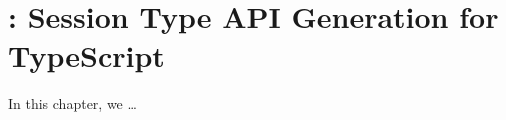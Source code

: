 \chapter{: Session Type API Generation for TypeScript}
\label{chap:codegen}

In this chapter, we \dots









